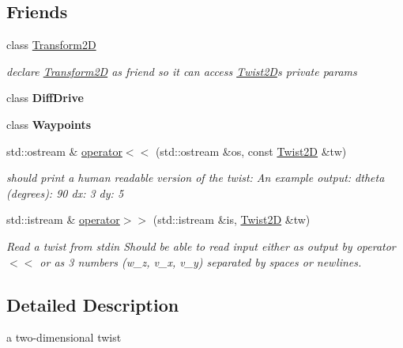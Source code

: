 \subsection*{Friends}
\begin{DoxyCompactItemize}
\item 
\mbox{\label{classrigid2d_1_1Twist2D_a49f4e819b5084b5347aff6e6559b596b}} 
class \hyperlink{classrigid2d_1_1Twist2D_a49f4e819b5084b5347aff6e6559b596b}{Transform2D}
\begin{DoxyCompactList}\small\item\em declare \hyperlink{classrigid2d_1_1Transform2D}{Transform2D} as friend so it can access \hyperlink{classrigid2d_1_1Twist2D}{Twist2D}\textquotesingle{}s private params \end{DoxyCompactList}\item 
\mbox{\label{classrigid2d_1_1Twist2D_a43d7c8fc235f7592079bde4168cd48d8}} 
class {\bfseries Diff\+Drive}
\item 
\mbox{\label{classrigid2d_1_1Twist2D_afeca09cf85f3491b24cdc9f9d41bab3d}} 
class {\bfseries Waypoints}
\item 
std\+::ostream \& \hyperlink{classrigid2d_1_1Twist2D_aa73bc548f9e2f87b66c08cd96443e792}{operator$<$$<$} (std\+::ostream \&os, const \hyperlink{classrigid2d_1_1Twist2D}{Twist2D} \&tw)
\begin{DoxyCompactList}\small\item\em should print a human readable version of the twist\+: An example output\+: dtheta (degrees)\+: 90 dx\+: 3 dy\+: 5 \end{DoxyCompactList}\item 
std\+::istream \& \hyperlink{classrigid2d_1_1Twist2D_a123979c39440643723bcd0e3e04812df}{operator$>$$>$} (std\+::istream \&is, \hyperlink{classrigid2d_1_1Twist2D}{Twist2D} \&tw)
\begin{DoxyCompactList}\small\item\em Read a twist from stdin Should be able to read input either as output by operator$<$$<$ or as 3 numbers (w\+\_\+z, v\+\_\+x, v\+\_\+y) separated by spaces or newlines. \end{DoxyCompactList}\end{DoxyCompactItemize}


\subsection{Detailed Description}
a two-\/dimensional twist 

